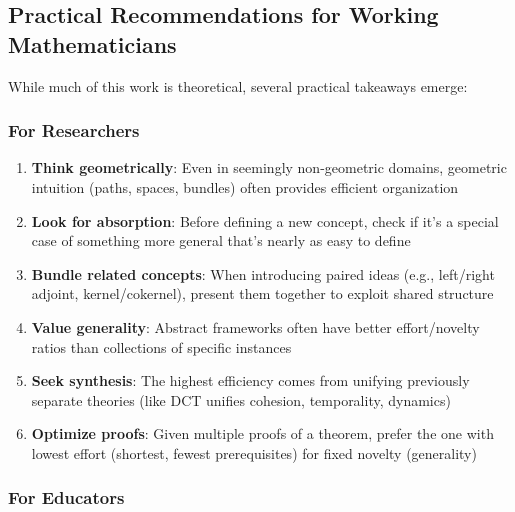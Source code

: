 \documentclass[11pt]{article}
\theoremstyle{definition}
\begin{document}
\subsection{Practical Recommendations for Working Mathematicians}

While much of this work is theoretical, several practical takeaways emerge:

\subsubsection{For Researchers}

\begin{enumerate}
\item \textbf{Think geometrically}: Even in seemingly non-geometric domains, geometric intuition (paths, spaces, bundles) often provides efficient organization

\item \textbf{Look for absorption}: Before defining a new concept, check if it's a special case of something more general that's nearly as easy to define

\item \textbf{Bundle related concepts}: When introducing paired ideas (e.g., left/right adjoint, kernel/cokernel), present them together to exploit shared structure

\item \textbf{Value generality}: Abstract frameworks often have better effort/novelty ratios than collections of specific instances

\item \textbf{Seek synthesis}: The highest efficiency comes from unifying previously separate theories (like DCT unifies cohesion, temporality, dynamics)

\item \textbf{Optimize proofs}: Given multiple proofs of a theorem, prefer the one with lowest effort (shortest, fewest prerequisites) for fixed novelty (generality)
\end{enumerate}

\subsubsection{For Educators}
\end{document}
